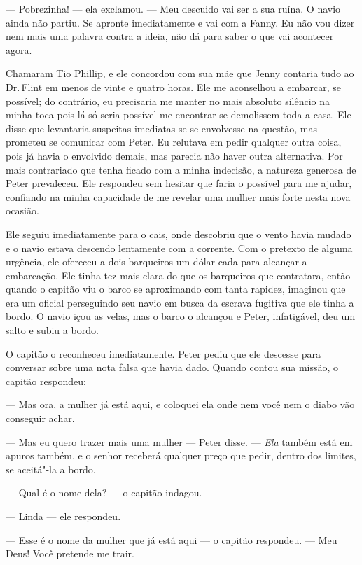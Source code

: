 --- Pobrezinha! --- ela exclamou. --- Meu descuido vai ser a sua ruína.
O navio ainda não partiu. Se apronte imediatamente e vai com a Fanny. Eu
não vou dizer nem mais uma palavra contra a ideia, não dá para saber o
que vai acontecer agora.

Chamaram Tio Phillip, e ele concordou
com sua mãe que Jenny contaria tudo ao Dr.\,Flint em menos de vinte e
quatro horas. Ele me aconselhou a embarcar, se possível; do contrário,
eu precisaria me manter no mais absoluto silêncio na minha toca pois lá
só seria possível me encontrar se demolissem toda a casa. Ele disse que
levantaria suspeitas imediatas se se envolvesse na questão, mas prometeu
se comunicar com Peter. Eu relutava em pedir qualquer outra coisa, pois
já havia o envolvido demais, mas parecia não haver outra alternativa.
Por mais contrariado que tenha ficado com a minha indecisão, a natureza
generosa de Peter prevaleceu. Ele respondeu sem hesitar que faria o
possível para me ajudar, confiando na minha capacidade de me revelar uma
mulher mais forte nesta nova ocasião.

Ele seguiu imediatamente para o cais,
onde descobriu que o vento havia mudado e o navio estava descendo
lentamente com a corrente. Com o pretexto de alguma urgência, ele
ofereceu a dois barqueiros um dólar cada para alcançar a embarcação. Ele
tinha tez mais clara do que os barqueiros que contratara, então quando o
capitão viu o barco se aproximando com tanta rapidez, imaginou que era
um oficial perseguindo seu navio em busca da escrava fugitiva que ele
tinha a bordo. O navio içou as velas, mas o barco o alcançou e Peter,
infatigável, deu um salto e subiu a bordo.

O capitão o reconheceu imediatamente.
Peter pediu que ele descesse para conversar sobre uma nota falsa que
havia dado. Quando contou sua missão, o capitão respondeu:

--- Mas ora, a mulher já está aqui, e coloquei ela onde nem você nem o
diabo vão conseguir achar.

--- Mas eu quero trazer mais uma mulher
--- Peter disse. --- \emph{Ela} também está em apuros também, e o senhor
receberá qualquer preço que pedir, dentro dos limites, se aceitá"-la a
bordo.

--- Qual é o nome dela? --- o capitão
indagou.

--- Linda --- ele respondeu.

--- Esse é o nome da mulher que já está
aqui --- o capitão respondeu. --- Meu Deus! Você pretende me trair.

